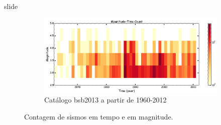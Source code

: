 \documentclass[ucs,8pt]{beamer}
\begin{document}
\begin{frame}{slide}
\begin{figure}[H]
	   \begin{subfigure}[b]{0.7\textheight}
		  	\centering
  			\includegraphics[height=1.00\textheight]{time_mag_count_br_1960}
			\caption{Catálogo \gls{bsb2013} a partir de 1960-2012}
			\label{fig:tmf_br_1960}
       \end{subfigure}%

  \caption{Contagem de sismos em tempo e em magnitude.}
  \label{fig:qc_time_mag_count} 
\end{figure}



\end{frame}
\end{document}
